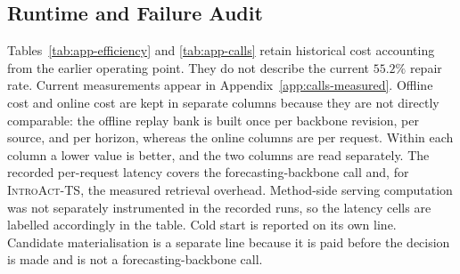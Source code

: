 \documentclass{article}
\newcommand{\introact}{\textsc{IntroAct-TS}}
\begin{document}
\subsection{Runtime and Failure Audit}
\label{app:calls}
Tables~\ref{tab:app-efficiency} and \ref{tab:app-calls} retain historical cost accounting
from the earlier operating point. They do not describe the current $55.2\%$ repair rate.
Current measurements appear in Appendix~\ref{app:calls-measured}. Offline cost and online cost are kept in separate columns because
they are not directly comparable: the offline replay bank is built once per backbone revision,
per source, and per horizon, whereas the online columns are per request. Within each column a
lower value is better, and the two columns are read separately. The recorded per-request
latency covers the forecasting-backbone call and, for \introact{}, the measured retrieval
overhead. Method-side serving computation was not separately instrumented in the recorded
runs, so the latency cells are labelled accordingly in the table. Cold start is
reported on its own line. Candidate materialisation is a separate line because it is paid
before the decision is made and is not a forecasting-backbone call.
\end{document}
